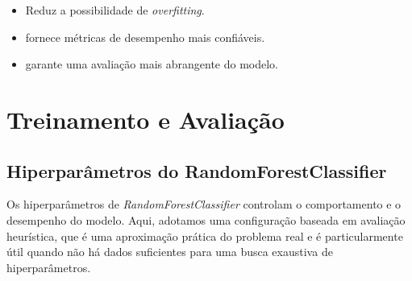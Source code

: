 \documentclass[a4paper,12pt]{article}
\begin{document}
\begin{itemize}
    \item Reduz a possibilidade de \textit{overfitting}.
    \item fornece métricas de desempenho mais confiáveis.
    \item garante uma avaliação mais abrangente do modelo.
\end{itemize}

\section{Treinamento e Avaliação}

\subsection{Hiperparâmetros do RandomForestClassifier}
Os hiperparâmetros de \textit{RandomForestClassifier} controlam o comportamento e o desempenho do modelo. Aqui, adotamos uma configuração baseada em avaliação heurística, que é uma aproximação prática do problema real e é particularmente útil quando não há dados suficientes para uma busca exaustiva de hiperparâmetros.
\end{document}
